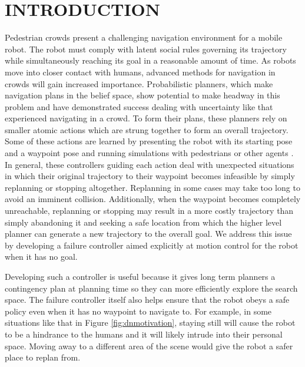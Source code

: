 \documentclass[letterpaper, 10 pt, conference]{ieeeconf}  %
\begin{document}
\section{INTRODUCTION}
	Pedestrian crowds present a challenging navigation environment for a mobile robot. The robot must comply with latent social rules governing its trajectory while simultaneously reaching its goal in a reasonable amount of time. As robots move into closer contact with humans, advanced methods for navigation in crowds will gain increased importance. Probabilistic planners, which make navigation plans in the belief space, show potential to make headway in this problem and have demonstrated success dealing with uncertainty \cite{ppcp} like that experienced navigating in a crowd. To form their plans, these planners rely on smaller atomic actions which are strung together to form an overall trajectory. Some of these actions are learned by presenting the robot with its starting pose and a waypoint pose and running simulations with pedestrians or other agents \cite{crowdawarerl}. In general, these controllers guiding each action deal with unexpected situations in which their original trajectory to their waypoint becomes infeasible by simply replanning or stopping altogether. Replanning in some cases may take too long to avoid an imminent collision. Additionally, when the waypoint becomes completely unreachable, replanning or stopping may result in a more costly trajectory than simply abandoning it and seeking a safe location from which the higher level planner can generate a new trajectory to the overall goal. We address this issue by developing a failure controller aimed explicitly at motion control for the robot when it has no goal.
	
	Developing such a controller is useful because it gives long term planners a contingency plan at planning time so they can more efficiently explore the search space. The failure controller itself also helps ensure that the robot obeys a safe policy even when it has no waypoint to navigate to. For example, in some situations like that in Figure \ref{fig:dnmotivation}, staying still will cause the robot to be a hindrance to the humans and it will likely intrude into their personal space. Moving away to a different area of the scene would give the robot a safer place to replan from.
	
\end{document}
